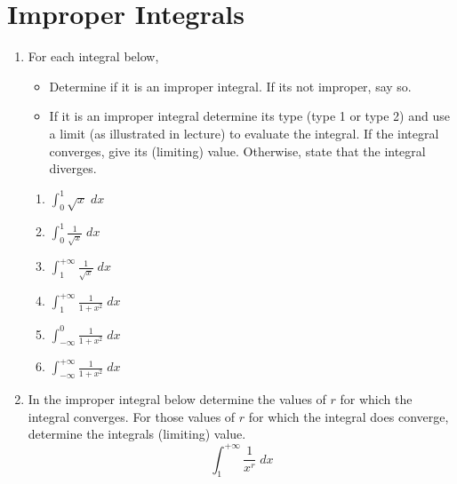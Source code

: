 \documentclass[12pt,letterpaper,fleqn]{article}
\theoremstyle{definition}
\newcommand{\dint}{\ensuremath{\displaystyle\int}}
\begin{document}
\section*{Improper Integrals}
%
\begin{enumerate}
 \item For each integral below,
 \begin{itemize}
  \item Determine if it is an improper integral. If its not improper, say so.
  \item If it is an improper integral determine its type (type 1 or type 2) and use a limit (as illustrated in lecture) to evaluate the integral. If the integral converges, give its (limiting) value. Otherwise, state that the integral diverges.
 \end{itemize}
 \begin{enumerate}
  \item $\dint_0^1\sqrt{x}\;dx$
  \item $\dint_0^1 \frac{1}{\sqrt{x}}\;dx$
  \item $\dint_1^{+\infty}\frac{1}{\sqrt{x}}\;dx$
  \item $\dint_1^{+\infty}\frac{1}{1+x^2}\;dx$
  \item $\dint_{-\infty}^0 \frac{1}{1+x^2}\;dx$
  \item $\dint_{-\infty}^{+\infty} \frac{1}{1+x^2}\;dx$
 \end{enumerate}
 \item In the improper integral below determine the values of $r$ for which the integral converges. For those values of $r$ for which the integral does converge, determine the integrals (limiting) value.
 \begin{equation*}
   \int_1^{+\infty} \frac{1}{x^r}\;dx
 \end{equation*}
\end{enumerate}
\end{document}
